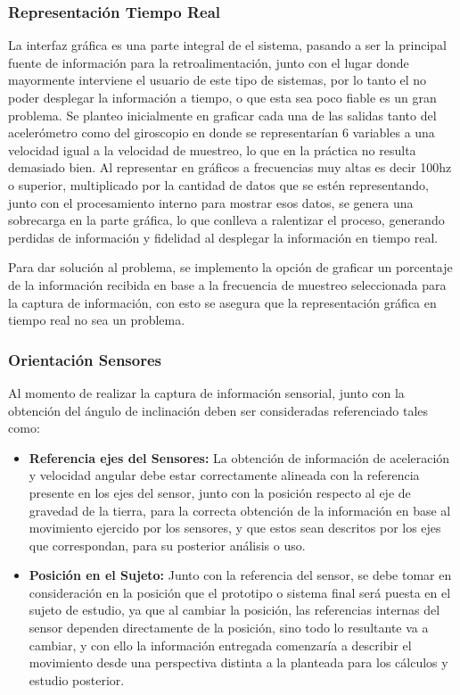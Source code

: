 \documentclass[12pt,a4paper]{article}
\begin{document}
\subsubsection{Representación Tiempo Real}
	La interfaz gráfica es una parte integral de el sistema, pasando a ser la principal fuente de información para la retroalimentación, junto con el lugar donde mayormente interviene el usuario de este tipo de sistemas, por lo tanto el no poder desplegar la información a tiempo, o que esta sea poco fiable es un gran problema. Se planteo inicialmente en graficar cada una de las salidas tanto del acelerómetro como del giroscopio en donde se representarían 6 variables a una velocidad igual a la velocidad de muestreo, lo que en la práctica no resulta demasiado bien. Al representar en gráficos a frecuencias muy altas es decir 100hz o superior, multiplicado por la cantidad de datos que se estén representando, junto con el procesamiento interno para mostrar esos datos, se genera una sobrecarga en la parte gráfica, lo que conlleva a ralentizar el proceso, generando perdidas de información y fidelidad al desplegar la información en tiempo real.

Para dar solución al problema, se implemento la opción de graficar un porcentaje de la información recibida en base a la frecuencia de muestreo seleccionada para la captura de información, con esto se asegura que la representación gráfica en tiempo real no sea un problema.

\subsubsection{Orientación Sensores}
Al momento de realizar la captura de información sensorial, junto con la obtención del ángulo de inclinación deben ser consideradas referenciado tales como:
\begin{itemize}

\item \textbf{Referencia ejes del Sensores:} La obtención de información de aceleración y velocidad angular debe estar correctamente alineada con la referencia presente en los ejes del sensor, junto con la posición respecto al eje de gravedad de la tierra, para la correcta obtención de la información en base al movimiento ejercido por los sensores, y que estos sean descritos por los ejes que correspondan, para su posterior análisis o uso.
    
\item \textbf{Posición en el Sujeto:} Junto con la referencia del sensor, se debe tomar en consideración en la posición que el prototipo o sistema final será puesta en el sujeto de estudio, ya que al cambiar la posición, las referencias internas del sensor dependen directamente de la posición, sino todo lo resultante va a cambiar, y con ello la información entregada comenzaría a describir el movimiento desde una perspectiva distinta a la planteada para los cálculos y estudio posterior.
\end{itemize}
\end{document}

